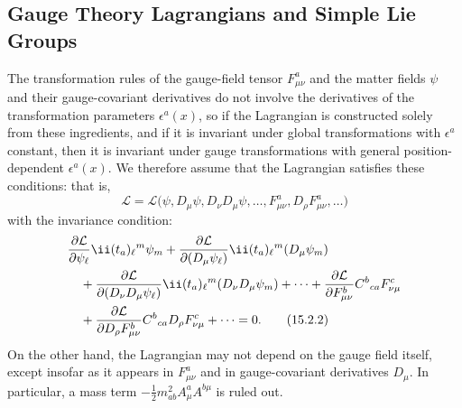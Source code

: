 
\subsection{Gauge Theory Lagrangians and Simple Lie Groups}
\label{sec:15.2}

The transformation rules of the gauge-field tensor $F^a_{\mu\nu}$ and
the matter fields $\psi$ and their gauge-covariant derivatives do not involve the
derivatives of the transformation parameters $\epsilon^a(x)$, so if the
Lagrangian is constructed solely from these ingredients, and if it is invariant
under global transformations with $\epsilon^a$ constant, then it is invariant
under gauge transformations with general position-dependent $\epsilon^a(x)$.
We therefore assume that the Lagrangian satisfies these conditions: that is,
\begin{equation}
 \mathcal L=\mathcal L\bigl(\psi,D_\mu\psi,D_\nu D_\mu\psi,\ldots,
 F^a_{\mu\nu},D_\rho F^a_{\mu\nu},\ldots\bigr)
 \tag{15.2.1}\label{eq:15.2.1}
\end{equation}
with the invariance condition:
\begin{align}
 &\frac{\partial\mathcal L}{\partial\psi_\ell}
 \ii(t_a)_\ell{}^m\psi_m
 +\frac{\partial\mathcal L}{\partial(D_\mu\psi_\ell)}
 \ii(t_a)_\ell{}^m(D_\mu\psi_m)\notag\\
 &\quad
 +\frac{\partial\mathcal L}{\partial(D_\nu D_\mu\psi_\ell)}
 \ii(t_a)_\ell{}^m(D_\nu D_\mu\psi_m)+\cdots
 +\frac{\partial\mathcal L}{\partial F^b_{\mu\nu}}
 C^b{}_{ca}F^c_{\nu\mu}\notag\\
 &\quad
 +\frac{\partial\mathcal L}{\partial D_\rho F^b_{\mu\nu}}
 C^b{}_{ca}D_\rho F^c_{\nu\mu}+\cdots=0 .
 \tag{15.2.2}\label{eq:15.2.2}
\end{align}
On the other hand, the Lagrangian may not depend on the gauge field itself,
except insofar as it appears in $F^a_{\mu\nu}$ and in gauge-covariant
derivatives $D_\mu$. In particular, a mass term
$-\frac12m^2_{ab}A^a_\mu A^{b\mu}$ is ruled out.


